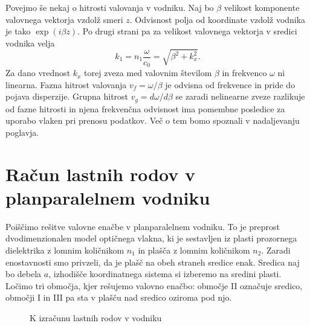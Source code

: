 Povejmo še nekaj o hitrosti valovanja v vodniku.
Naj bo $\beta$ velikost komponente valovnega vektorja vzdolž smeri $z$. Odvisnost polja
od koordinate vzdolž vodnika je tako $\exp (i\beta z)$. Po drugi strani pa za velikost
valovnega vektorja v sredici vodnika velja
\begin{equation}
k_1 = n_{1}\frac{\omega}{c_0}=\sqrt{\beta^{2}+k_{x}^{2}}
\label{9.0}.
\end{equation}
Za dano vrednost $k_{x}$ torej zveza med valovnim številom $\beta$
in frekvenco $\omega$ ni linearna. Fazna hitrost 
valovanja $v_{f}=\omega/\beta$ je
odvisna od frekvence in pride do pojava disperzije. Grupna 
hitrost $v_{g}=d\omega/d\beta$ 
se zaradi nelinearne zveze razlikuje od fazne hitrosti in njena frekvenčna odvisnost 
ima pomembne posledice za uporabo vlaken pri prenosu podatkov. Več o tem bomo spoznali 
v nadaljevanju poglavja. 

\section{Račun lastnih rodov v planparalelnem vodniku}
Poiščimo rešitve valovne enačbe v planparalelnem vodniku. 
To je preprost dvodimenzionalen model optičnega vlakna, ki je sestavljen iz 
plasti prozornega dielektrika z lomnim količnikom $n_1$ in plašča z lomnim količnikom $n_2$.
Zaradi enostavnosti smo privzeli, da je plašč na obeh straneh sredice enak.
Sredica naj bo debela $a$, izhodišče koordinatnega sistema
si izberemo na sredini plasti. Ločimo tri območja, kjer rešujemo valovno enačbo:
območje II označuje sredico, območji I in III pa sta v plašču nad sredico oziroma pod njo. 

\begin{figure}[h]
\centering
\def\svgwidth{120truemm} 

\caption{K izračunu lastnih rodov v vodniku}
\label{fig:vodnikracun}
\end{figure}

